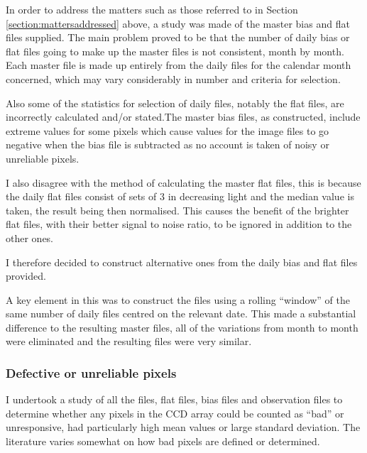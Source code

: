 In order to address the matters such as those referred to in Section
\ref{section:mattersaddressed} above, a study was made of the master bias and
flat files supplied. The main problem proved to be that the number of daily bias
or flat files going to make up the master files is not consistent, month by
month. Each master file is made up entirely from the daily files for the
calendar month concerned, which may vary considerably in number and criteria for selection.

Also some of the statistics for selection of daily files, notably the flat
files, are incorrectly calculated and/or stated.The master bias
files, as constructed, include extreme values for some pixels which cause
values for the image files to go negative when the bias file is subtracted as
no account is taken of noisy or unreliable pixels.

I also disagree with the method of calculating the master flat files, this is
because the daily flat files consist of sets of 3 in decreasing light and the
median value is taken, the result being then normalised. This causes the
benefit of the brighter flat files, with their better signal to noise ratio,
to be ignored in addition to the other ones.

I therefore decided to construct alternative ones from the daily bias and flat files
provided.

A key element in this was to construct the files using a rolling ``window'' of
the same number of daily files centred on the relevant date. This made a
substantial difference to the resulting master files, all of the variations
from month to month were eliminated and the resulting files were very similar.

\subsubsection{Defective or unreliable pixels}
\protect\label{section:badpix}

I undertook a study of all the files, flat files, bias files and observation
files to determine whether any pixels in the CCD array could be counted as
``bad'' or unresponsive, had particularly high mean values or large standard
deviation. The literature varies somewhat on how bad pixels are defined or
determined.

